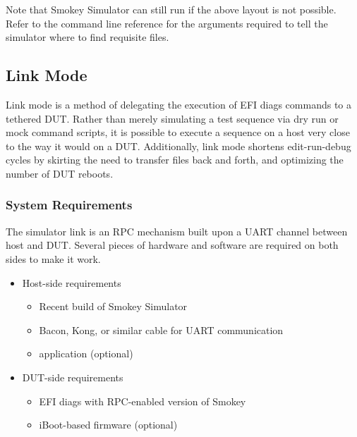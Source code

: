Note that Smokey Simulator can still run if the above layout is not possible.
Refer to the command line reference for the arguments required to tell the
simulator where to find requisite files.

\subsection{Link Mode}

Link mode is a method of delegating the execution of EFI diags commands to a
tethered DUT.  Rather than merely simulating a test sequence via dry run or
mock command scripts, it is possible to execute a sequence on a host very close
to the way it would on a DUT.  Additionally, link mode shortens edit-run-debug
cycles by skirting the need to transfer files back and forth, and optimizing
the number of DUT reboots.

\subsubsection{System Requirements}

The simulator link is an RPC mechanism built upon a UART channel between host
and DUT.  Several pieces of hardware and software are required on both sides to
make it work.

\begin{itemize}

	\item Host-side requirements

	\begin{itemize}

		\item Recent build of Smokey Simulator

		\item Bacon, Kong, or similar cable for UART communication

		\item {} application (optional)

	\end{itemize}

	\item DUT-side requirements

	\begin{itemize}

		\item EFI diags with RPC-enabled version of Smokey

		\item iBoot-based firmware (optional)

	\end{itemize}

\end{itemize}

